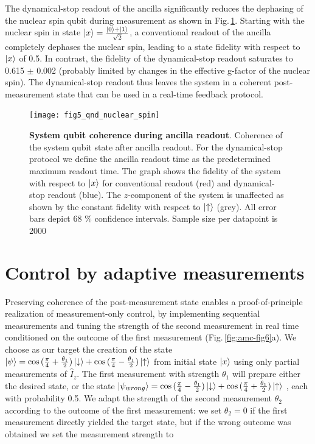 The dynamical-stop readout of the ancilla significantly reduces the dephasing of the nuclear spin qubit during measurement as shown in Fig.\,\ref{fig:amc-fig5}. Starting with the nuclear spin in state $\left|x\right> = \frac{\left|0\right> + \left|1\right>}{\sqrt{2}}$, a conventional readout of the ancilla completely dephases the nuclear spin, leading to a state fidelity with respect to $\left|x\right>$ of 0.5. In contrast, the fidelity of the dynamical-stop readout saturates to 0.615 $\pm$ 0.002 (probably limited by changes in the effective g-factor of the nuclear spin). The dynamical-stop readout thus leaves the system in a coherent post-measurement state that can be used in a real-time feedback protocol. 

\begin{figure}
	\centering
	\texttt{[image: fig5\_qnd\_nuclear\_spin]}
	\caption{\label{fig:amc-fig5} \textbf{System qubit coherence during ancilla readout}. Coherence of the system qubit state after ancilla readout. For the dynamical-stop protocol we define the ancilla readout time as the predetermined maximum readout time. The graph shows the fidelity of the system with respect to $\left|x\right>$ for conventional readout (red) and dynamical-stop readout (blue). The $z$-component of the system is unaffected as shown by the constant fidelity with respect to $\left|\uparrow\right>$ (grey). All error bars depict 68 $\%$ confidence intervals. Sample size per datapoint is 2000 }
\end{figure}

\section{Control by adaptive measurements}
Preserving coherence of the post-measurement state enables a proof-of-principle realization of measurement-only control, by implementing sequential measurements and tuning the strength of the second measurement in real time conditioned on the outcome of the first measurement (Fig.\,\ref{fig:amc-fig6}a). We choose as our target the creation of the state $\left|\psi\right> = \cos{(\frac{\pi}{4}+\frac{\theta_1}{2})}\left|\downarrow\right>+\cos{(\frac{\pi}{4}-\frac{\theta_1}{2})}\left|\uparrow\right>$ from initial state $\left|x\right>$ using only partial measurements of $\hat{I}_z$. The first measurement with strength $\theta_1$ will prepare either the desired state, or the state $\left|\psi_{wrong}\right> =  \cos{(\frac{\pi}{4}-\frac{\theta_1}{2})}\left|\downarrow\right>+\cos{(\frac{\pi}{4}+\frac{\theta_1}{2})}\left|\uparrow\right>$ , each with probability 0.5. We adapt the strength of the second measurement $\theta_2$ according to the outcome of the first measurement: we set $\theta_2 = 0$ if the first measurement directly yielded the target state, but if the wrong outcome was obtained we set the measurement strength to

